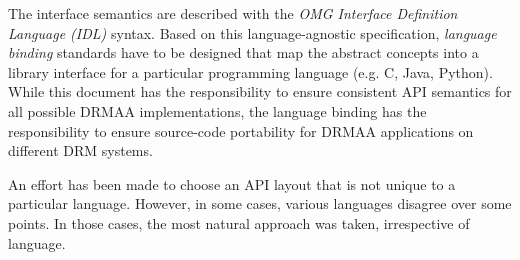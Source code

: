 \documentclass{article}
\begin{document}
The interface semantics are described with the \emph{OMG Interface Definition Language (IDL)} \cite{idl} syntax. Based on this language-agnostic specification, \emph{language binding} standards have to be designed that map the abstract concepts into a library interface for a particular programming language (e.g. C, Java, Python). While this document has the responsibility to ensure consistent API semantics for all possible DRMAA implementations, the language binding has the responsibility to ensure source-code portability for DRMAA applications on different DRM systems. 

An effort has been made to choose an API layout that is not unique to a particular language. However, in some cases, various languages disagree over some points. In those cases, the most natural approach was taken, irrespective of language. 
\end{document}
